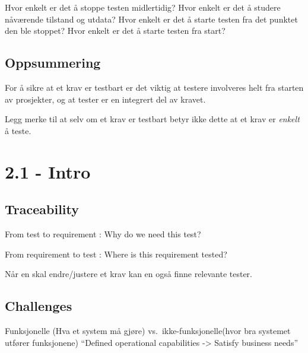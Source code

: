 Hvor enkelt er det å stoppe testen midlertidig? Hvor enkelt er det å
studere nåværende tilstand og utdata? Hvor enkelt er det å starte testen
fra det punktet den ble stoppet? Hvor enkelt er det å starte testen fra
start?

\subsection{Oppsummering}

For å sikre at et krav er testbart er det viktig at testere involveres
helt fra starten av prosjekter, og at tester er en integrert del av
kravet.

Legg merke til at selv om et krav er testbart betyr ikke dette at et
krav er \emph{enkelt} å teste.

\section{2.1 - Intro}

\subsection{Traceability}

From test to requirement : Why do we need this test?

From requirement to test : Where is this requirement tested?

Når en skal endre/justere et krav kan en også finne relevante tester.

\subsection{Challenges}

Funksjonelle (Hva et system må gjøre) vs.~ikke-funksjonelle(hvor bra
systemet utfører funksjonene) ``Defined operational capabilities
-\textgreater{} Satisfy business needs''

